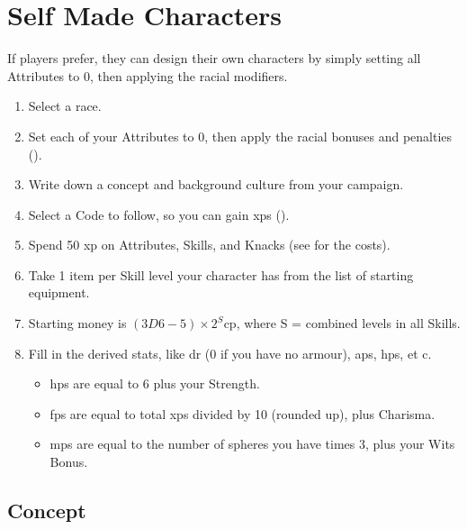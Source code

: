 \section{Self Made Characters}

\begin{multicols}{2}

\label{playerchosen}

If players prefer, they can design their own characters by simply setting all Attributes to 0, then applying the racial modifiers.

\begin{enumerate}
  \item\label{sumCCrace}
  Select a race.
  \item\label{sumCCatt}
  Set each of your Attributes to 0, then apply the racial bonuses and penalties ().
  \item\label{sumCCconcept}
  Write down a concept and background culture from your campaign.
  \item\label{sumCCcode}
  Select a Code to follow, so you can gain \glspl{xp} ().
  \item\label{sumCCxp}
  Spend 50 \gls{xp} on Attributes, Skills, and Knacks (see  for the costs).
  \item\label{sumCCequip}
  Take 1 item per Skill level your character has from the list of starting equipment.
  \item\label{sumCCcoin}
  Starting money is $(3D6-5)\times 2^S$\gls{cp}, where S = combined levels in all Skills.
  \item\label{sumCCder}
  Fill in the derived stats, like \gls{dr} (0 if you have no armour), \glspl{ap}, \glspl{hp}, et c.
  \begin{itemize}
    \item
    \glspl{hp} are equal to 6 plus your Strength.
    \item
    \glspl{fp} are equal to total \glspl{xp} divided by 10 (rounded up), plus Charisma.
    \item
    \glspl{mp} are equal to the number of spheres you have times 3, plus your Wits Bonus.
  \end{itemize}
\end{enumerate}

\subsection{Concept}


\end{multicols}
